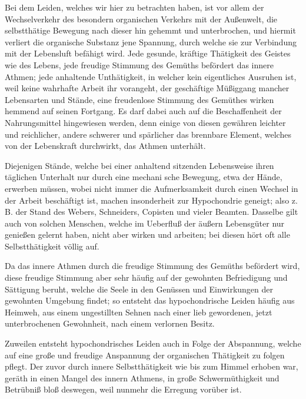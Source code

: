 Bei dem Leiden, welches wir hier zu betrachten haben, ist vor allem der Wechselverkehr des besondern organischen Verkehrs mit der Außenwelt, die selbstthätige Bewegung nach dieser hin gehemmt und unterbrochen, und hiermit verliert die organische Substanz jene Spannung, durch welche sie zur Verbindung mit der Lebensluft befähigt wird. Jede gesunde, kräftige Thätigkeit des Geistes wie des Lebens, jede freudige Stimmung des Gemüths befördert das innere Athmen; jede anhaltende Unthätigkeit, in welcher kein eigentliches Ausruhen ist, weil keine wahrhafte Arbeit ihr vorangeht, der geschäftige Müßiggang mancher Lebensarten und Stände, eine freudenlose Stimmung des Gemüthes wirken hemmend auf seinen Fortgang. Es darf dabei auch auf die Beschaffenheit der Nahrungsmittel hingewiesen werden, denn einige von diesen gewähren leichter und reichlicher, andere schwerer und spärlicher das brennbare Element, welches von der Lebenskraft durchwirkt, das Athmen unterhält.

Diejenigen Stände, welche bei einer anhaltend sitzenden Lebensweise ihren täglichen Unterhalt nur durch eine mechani%
sche Bewegung, etwa der Hände, erwerben müssen, wobei nicht immer die Aufmerksamkeit durch einen Wechsel in der Arbeit beschäftigt ist, machen insonderheit zur Hypochondrie geneigt; also z. B. der Stand des Webers, Schneiders, Copisten und vieler Beamten. Dasselbe gilt auch von solchen Menschen, welche im Ueberfluß der äußern Lebensgüter nur genießen gelernt haben, nicht aber wirken und arbeiten; bei diesen hört oft alle Selbstthätigkeit völlig auf.

Da das innere Athmen durch die freudige Stimmung des Gemüths befördert wird, diese freudige Stimmung aber sehr häufig auf der gewohnten Befriedigung und Sättigung beruht, welche die Seele in den Genüssen und Einwirkungen der gewohnten Umgebung findet; so entsteht das hypochondrische Leiden häufig aus Heimweh, aus einem ungestillten Sehnen nach einer lieb gewordenen, jetzt unterbrochenen Gewohnheit, nach einem verlornen Besitz.

Zuweilen entsteht hypochondrisches Leiden auch in Folge der Abspannung, welche auf eine große und freudige Anspannung der organischen Thätigkeit zu folgen pflegt. Der zuvor durch innere Selbstthätigkeit wie bis zum Himmel erhoben war, geräth in einen Mangel des innern Athmens, in große Schwermüthigkeit und Betrübniß bloß deswegen, weil nunmehr die Erregung vorüber ist.

